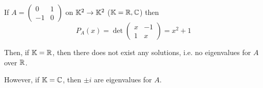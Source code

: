\begin{example}
If \(A  = \begin{pmatrix}
 0 & 1 \\
 -1 & 0
\end{pmatrix}\) on \(\mathbb{K}^2 \to \mathbb{K}^2 \) (\(\mathbb{K} = \mathbb{R}, \mathbb{C}\)) then \[
P_A(x) = \det \begin{pmatrix}
 x & -1 \\
 1 & x
\end{pmatrix} = x^2 + 1
\]

Then, if \(\mathbb{K} = \mathbb{R}\), then there does not exist any solutions, i.e. no eigenvalues for \(A\) over \(\mathbb{R}\).

However, if \(\mathbb{K} = \mathbb{C}\), then \(\pm i\) are eigenvalues for \(A\).
\end{example}
